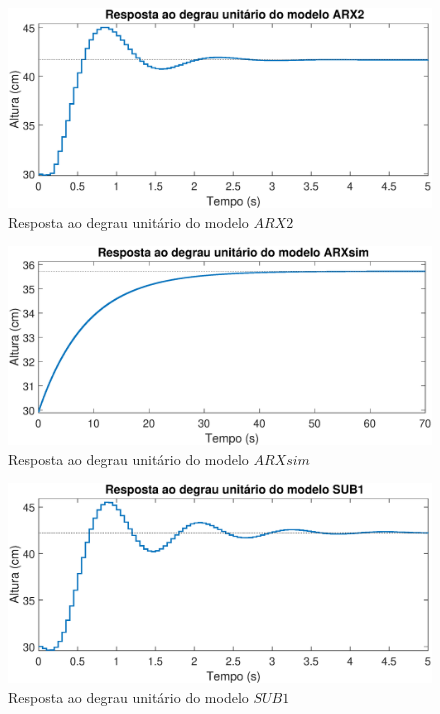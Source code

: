\begin{figure}[H]
	\centering
	\includegraphics[width=1\linewidth]{respostadegrauarx2}
	\caption[Resposta ao degrau do modelo $ARX2$]{Resposta ao degrau unitário do modelo $ARX2$}
	\label{fig:respostadegrauarx2}
\end{figure}

\begin{figure}[H]
	\centering
	\includegraphics[width=1\linewidth]{respostadegrauarxsim}
	\caption[Resposta ao degrau do modelo $ARXsim$]{Resposta ao degrau unitário do modelo $ARXsim$}
	\label{fig:respostadegrauarxsim}
\end{figure}

\begin{figure}[H]
	\centering
	\includegraphics[width=1\linewidth]{respostadegrausub1}
	\caption[Resposta ao degrau do modelo $SUB1$]{Resposta ao degrau unitário do modelo $SUB1$}
	\label{fig:respostadegrausub}
\end{figure}



